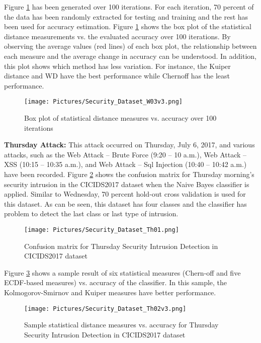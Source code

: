 \documentclass{article}
\begin{document}
Figure \ref{fig_W03} has been generated over 100 iterations. For each iteration, 70 percent of the data has been randomly extracted for testing and training and the rest has been used for accuracy estimation. Figure \ref{fig_W03} shows the box plot of the statistical distance measurements vs. the evaluated accuracy over 100 iterations. By observing the average values (red lines) of each box plot, the relationship between each measure and the average change in accuracy can be understood. In addition, this plot shows which method has less variation. For instance, the Kuiper distance and WD have the best performance while Chernoff has the least performance.

\begin{figure}
\texttt{[image: Pictures/Security\_Dataset\_W03v3.png]}
\caption{Box plot of statistical distance measures vs. accuracy over 100 iterations} \label{fig_W03}
\end{figure}

\begin{comment}
\todo[inline]{Figures \ref{fig_W03} and the following are not readable.}
\end{comment}

\textbf{Thursday Attack:} This attack occurred on Thursday, July 6, 2017, and various attacks, such as the Web Attack – Brute Force (9:20 – 10 a.m.), Web Attack – XSS (10:15 – 10:35 a.m.), and Web Attack – Sql Injection (10:40 – 10:42 a.m.) have been recorded. Figure \ref{fig_Th01} shows the confusion matrix for Thursday morning's security intrusion in the CICIDS2017 dataset when the Naive Bayes classifier is applied. Similar to Wednesday, 70 percent hold-out cross validation is used for this dataset. As can be seen, this dataset has four classes and the classifier has problem to detect the last class or last type of intrusion. 

\begin{figure}
\centering
\texttt{[image: Pictures/Security\_Dataset\_Th01.png]}
\caption{Confusion matrix for Thursday Security Intrusion Detection in CICIDS2017 dataset} \label{fig_Th01}
\end{figure}

Figure \ref{fig_Th02} shows a sample result of six statistical measures (Chern-off and five ECDF-based measures) vs. accuracy of the classifier. In this sample, the Kolmogorov-Smirnov and Kuiper measures have better performance.

\begin{figure}
\texttt{[image: Pictures/Security\_Dataset\_Th02v3.png]}
\caption{Sample statistical distance measures vs. accuracy for Thursday Security Intrusion Detection in CICIDS2017 dataset} \label{fig_Th02}
\end{figure}
\end{document}
